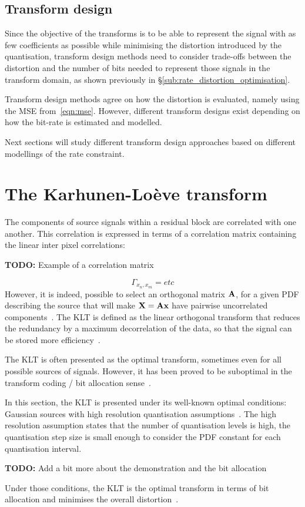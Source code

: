 \documentclass[11pt,a4paper,openright,twoside]{book}
\providecommand{\todo}[1]{
	\begin{center}
		\colorbox{almostwhite}{
			\begin{minipage}{0.85\linewidth}
				\textbf{TODO:} #1
			\end{minipage}
		}
	\end{center}
}
\numberwithin{equation}{section} %
\numberwithin{figure}{section} %
\numberwithin{table}{section} %
\begin{document}
\subsection{Transform design}
\label{sub:transform_design}

Since the objective of the transforms is to be able to represent the signal
with as few coefficients as possible while minimising the distortion
introduced by the quantisation, transform design methods need to consider
trade-offs between the distortion and the number of bits needed to represent
those signals in the transform domain, as shown previously in
\S\ref{sub:rate_distortion_optimisation}.

Transform design methods agree on how the distortion is evaluated, namely
using the \ac{MSE} from~\eqref{eqn:mse}.
However, different transform designs exist depending on how the bit-rate is
estimated and modelled.

Next sections will study different transform design approaches based on
different modellings of the rate constraint.
\section{The Karhunen-Loève transform}
\label{sec:the_karhunen_loeve_transform}
The components of source signals within a residual block are correlated with
one another.
This correlation is expressed in terms of a correlation matrix containing the
linear inter pixel correlations:
\todo{Example of a correlation matrix}
\begin{equation}
	\Gamma_{x_n,x_m} = etc
\end{equation}
However, it is indeed, possible to select an orthogonal matrix $\mathbf{A}$, for
a given \ac{PDF} describing the source that will make $\mathbf{X}=\mathbf{A}\mathbf{x}$ have
pairwise uncorrelated components~\cite{gersho-92-vector-quantization}.
The \ac{KLT} is defined as the linear orthogonal transform that reduces the
redundancy by a maximum decorrelation of the data, so that the signal can be
stored more efficiency~\cite{rao-01-transform-data-compression-book}.

The \ac{KLT} is often presented as the optimal transform, sometimes even for
all possible sources of signals.
However, it has been proved to be suboptimal in the transform coding / bit
allocation sense~\cite{effros-04-suboptimal-klt}.

In this section, the \ac{KLT} is presented under its well-known optimal
conditions: Gaussian sources with high resolution quantisation
assumptions~\cite{goyal-00-high-resolution}.
The high resolution assumption states that the number of quantisation
levels is high, the quantisation step size is small enough to consider the
\ac{PDF} constant for each quantisation interval.
\todo{Add a bit more about the demonstration and the bit allocation}
Under those conditions, the \ac{KLT} is the optimal transform in terms
of bit allocation and minimises the overall
distortion~\cite{gersho-92-vector-quantization}.
\end{document}

